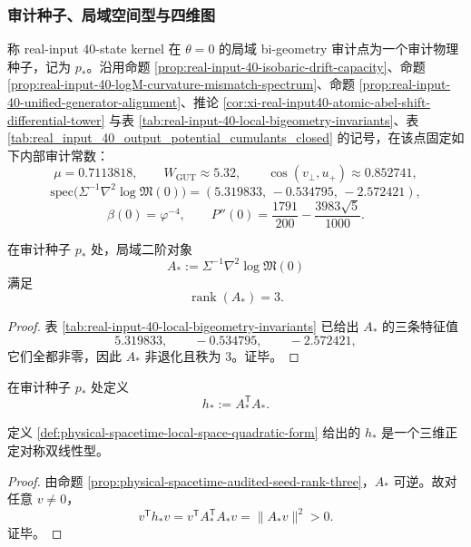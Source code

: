\subsubsection{审计种子、局域空间型与四维图}

\begin{definition}[审计物理种子]\label{def:physical-spacetime-audited-physical-seed}
称 real-input \(40\)-state kernel 在 \(\theta=0\) 的局域 bi-geometry 审计点为一个审计物理种子，记为 \(p_\ast\)。沿用命题 \ref{prop:real-input-40-isobaric-drift-capacity}、命题 \ref{prop:real-input-40-logM-curvature-mismatch-spectrum}、命题 \ref{prop:real-input-40-unified-generator-alignment}、推论 \ref{cor:xi-real-input40-atomic-abel-shift-differential-tower} 与表 \ref{tab:real-input-40-local-bigeometry-invariants}、表 \ref{tab:real_input_40_output_potential_cumulants_closed} 的记号，在该点固定如下内部审计常数：
\[
\mu=0.7113818,\qquad
W_{\mathrm{GUT}}\approx 5.32,\qquad
\cos(v_\perp,u_+)\approx 0.852741,
\]
\[
\mathrm{spec}\!\bigl(\Sigma^{-1}\nabla^2\log\mathfrak M(0)\bigr)
=(5.319833,\,-0.534795,\,-2.572421),
\]
\[
\beta(0)=\varphi^{-4},\qquad
P''(0)=\frac{1791}{200}-\frac{3983\sqrt5}{1000}.
\]
\end{definition}

\begin{proposition}[审计种子的空间秩]\label{prop:physical-spacetime-audited-seed-rank-three}
在审计种子 \(p_\ast\) 处，局域二阶对象
\[
A_\ast:=\Sigma^{-1}\nabla^2\log\mathfrak M(0)
\]
满足
\[
\operatorname{rank}(A_\ast)=3.
\]
\end{proposition}
\begin{proof}
表 \ref{tab:real-input-40-local-bigeometry-invariants} 已给出 \(A_\ast\) 的三条特征值
\[
5.319833,\qquad -0.534795,\qquad -2.572421,
\]
它们全都非零，因此 \(A_\ast\) 非退化且秩为 \(3\)。证毕。
\end{proof}

\begin{definition}[局域空间二次型]\label{def:physical-spacetime-local-space-quadratic-form}
在审计种子 \(p_\ast\) 处定义
\[
h_\ast:=A_\ast^{\mathsf T}A_\ast.
\]
\end{definition}

\begin{proposition}[局域空间二次型的正定性]\label{prop:physical-spacetime-local-space-quadratic-positive}
定义 \ref{def:physical-spacetime-local-space-quadratic-form} 给出的 \(h_\ast\) 是一个三维正定对称双线性型。
\end{proposition}
\begin{proof}
由命题 \ref{prop:physical-spacetime-audited-seed-rank-three}，\(A_\ast\) 可逆。故对任意 \(v\neq 0\)，
\[
v^{\mathsf T}h_\ast v=v^{\mathsf T}A_\ast^{\mathsf T}A_\ast v=\lVert A_\ast v\rVert^2>0.
\]
证毕。
\end{proof}

